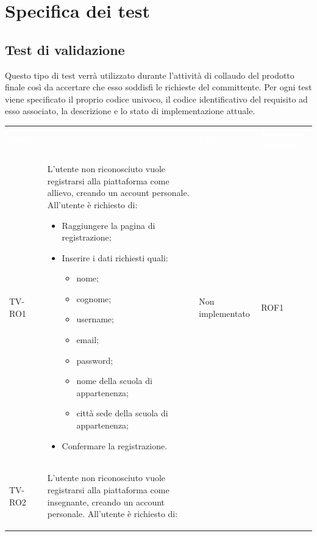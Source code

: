 \appendix
\section{Specifica dei test}
\subsection{Test di validazione}
Questo tipo di test verrà utilizzato durante l'attività di collaudo del prodotto finale così da accertare che esso soddisfi le richieste del committente. Per ogni test viene specificato il proprio codice univoco, il codice identificativo del requisito ad esso associato, la descrizione e lo stato di implementazione attuale. 

	\begin{longtable}{|>{\centering\arraybackslash}m{1.6cm}|>{\centering\arraybackslash}m{6.41cm}|>{\centering\arraybackslash}m{3.1cm} | >{\centering\arraybackslash}m{2.6cm}|}		
		\rowcolor{LightBlue}
		\textbf{\textcolor{white}{Codice}}
		& \multicolumn{1}{|c|}{\textbf{\textcolor{white}{ Descrizione}}}
		& \textbf{\textcolor{white}{Esito}} & \textbf{\textcolor{white}{Requisito associato}}\\
		TV-RO1 & L'utente non riconosciuto vuole registrarsi alla piattaforma come allievo, creando un account personale. All'utente è richiesto di:
		\begin{itemize}
			\item Raggiungere la pagina di registrazione;
			\item Inserire i dati richiesti quali:
				\begin{itemize}
				 	\item nome;
				 	\item cognome;
				 	\item username;
				 	\item email;
				 	\item password;
				 	\item nome della scuola di appartenenza;
				 	\item città sede della scuola di appartenenza;
				\end{itemize}
			\item Confermare la registrazione.
		\end{itemize} & Non implementato & ROF1 \\ \hline
		\rowcolor{LightGray}
		TV-RO2 & L'utente non riconosciuto vuole registrarsi alla piattaforma come insegnante, creando un account personale. All'utente è richiesto di:
		\begin{itemize}

\end{itemize}
\end{longtable}
